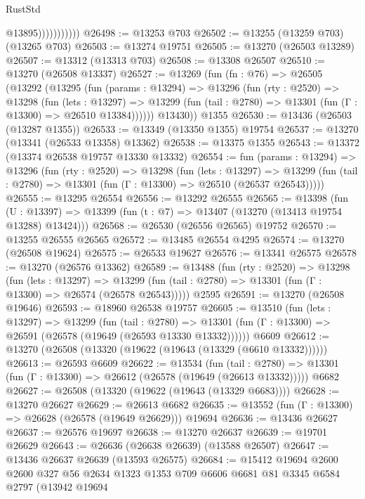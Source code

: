 \begin{lexlean}{RustStd}
\begin{coremodule}
                          @13895)))))))))))
@26498 := @13253 @703
@26502 := @13255 (@13259 @703) (@13265 @703)
@26503 := @13274 @19751
@26505 := @13270 (@26503 @13289)
@26507 := @13312 (@13313 @703)
@26508 := @13308 @26507
@26510 := @13270 (@26508 @13337)
@26527 := @13269
    (fun (fn : @76) =>
    @26505
      (@13292
        (@13295
          (fun (params : @13294) =>
          @13296
            (fun (rty : @2520) =>
            @13298
              (fun (lets : @13297) =>
              @13299 (fun (tail : @2780) => @13301 (fun (Γ : @13300) => @26510 @13384))))))
        @13430))
    @1355
@26530 := @13436 (@26503 (@13287 @1355))
@26533 := @13349 (@13350 @1355) @19754
@26537 := @13270 (@13341 (@26533 @13358) @13362)
@26538 := @13375 @1355
@26543 := @13372 (@13374 @26538 @19757 @13330 @13332)
@26554 := fun (params : @13294) =>
  @13296
    (fun (rty : @2520) =>
    @13298
      (fun (lets : @13297) =>
      @13299 (fun (tail : @2780) => @13301 (fun (Γ : @13300) => @26510 (@26537 @26543)))))
@26555 := @13295 @26554
@26556 := @13292 @26555
@26565 := @13398
    (fun (U : @13397) => @13399 (fun (t : @7) => @13407 (@13270 (@13413 @19754 @13288) @13424)))
@26568 := @26530 (@26556 @26565) @19752
@26570 := @13255 @26555 @26565
@26572 := @13485 @26554 @4295
@26574 := @13270 (@26508 @19624)
@26575 := @26533 @19627
@26576 := @13341 @26575
@26578 := @13270 (@26576 @13362)
@26589 := @13488
    (fun (rty : @2520) =>
    @13298
      (fun (lets : @13297) =>
      @13299 (fun (tail : @2780) => @13301 (fun (Γ : @13300) => @26574 (@26578 @26543)))))
    @2595
@26591 := @13270 (@26508 @19646)
@26593 := @18960 @26538 @19757
@26605 := @13510
    (fun (lets : @13297) =>
    @13299
      (fun (tail : @2780) =>
      @13301 (fun (Γ : @13300) => @26591 (@26578 (@19649 (@26593 @13330 @13332))))))
    @6609
@26612 := @13270 (@26508 (@13320 (@19622 (@19643 (@13329 (@6610 @13332))))))
@26613 := @26593 @6609
@26622 := @13534
    (fun (tail : @2780) => @13301 (fun (Γ : @13300) => @26612 (@26578 (@19649 (@26613 @13332)))))
    @6682
@26627 := @26508 (@13320 (@19622 (@19643 (@13329 @6683))))
@26628 := @13270 @26627
@26629 := @26613 @6682
@26635 := @13552 (fun (Γ : @13300) => @26628 (@26578 (@19649 @26629))) @19694
@26636 := @13436 @26627
@26637 := @26576 @19697
@26638 := @13270 @26637
@26639 := @19701 @26629
@26643 := @26636 (@26638 @26639) (@13588 @26507)
@26647 := @13436 @26637 @26639 (@13593 @26575)
@26684 := @15412
    @19694
    @2600
    @2600
    @327
    @56
    @2634
    @1323
    @1353
    @709
    @6606
    @6681
    @81
    @3345
    @6584
    @2797
    (@13942
      @19694

\end{coremodule}
\end{lexlean}
